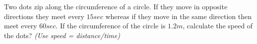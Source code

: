 
%
%
%
%
% 
% 

\question Two dots zip along the circumference of a circle. If they move in opposite directions they meet every $15sec$ whereas if they move in the same direction then meet every $60sec$. If the circumference of the circle is $1.2m$, calculate the speed of the dots? \textit{(Use speed = distance/time)}

\insertQR{}

\ifprintanswers
\fi 

